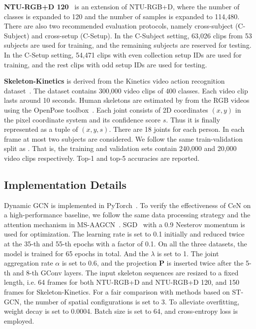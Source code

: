 \documentclass[sigconf]{acmart}
\begin{document}
\noindent\textbf{NTU-RGB+D 120}~\cite{liu2019ntu} is an extension of NTU-RGB+D, where the number of classes is expanded to 120 and the number of samples is expanded to 114,480. There are also two recommended evaluation protocols, namely cross-subject (C-Subject) and cross-setup (C-Setup). In the C-Subject setting, 63,026 clips from 53 subjects are used for training, and the remaining subjects are reserved for testing. In the C-Setup setting, 54,471 clips with even collection setup IDs are used for training, and the rest clips with odd setup IDs are used for testing.

\noindent\textbf{Skeleton-Kinetics} is derived from the Kinetics video action recognition dataset~\cite{kay2017kinetics}. The dataset contains 300,000 video clips of 400 classes. Each video clip lasts around 10 seconds. Human skeletons are estimated by \cite{yanspatial} from the RGB videos using the OpenPose toolbox~\cite{cao2018openpose}. Each joint consists of 2D coordinates $(x, y)$ in the pixel coordinate system and its confidence score $s$. Thus it is finally represented as a tuple of $(x, y, s)$. There are 18 joints for each person. In each frame at most two subjects are considered. We follow the same train-validation split as \cite{yanspatial}. That is, the training and validation sets contain 240,000 and 20,000 video clips respectively. Top-1 and top-5 accuracies are reported.

\subsection{Implementation Details}
Dynamic GCN is implemented in PyTorch~\cite{paszke2017automatic}. To verify the effectiveness of CeN on a high-performance baseline, we follow the same data processing strategy and the attention mechanism in MS-AAGCN~\cite{shi2019}. SGD~\cite{bottou2010large} with a 0.9 Nesterov momentum is used for optimization. The learning rate is set to 0.1 initially and reduced twice at the 35-th and 55-th epochs with a factor of 0.1. On all the three datasets, the model is trained for 65 epochs in total. And the $\lambda$ is set to 1. The joint aggregation rate $\alpha $ is set to 0.6, and the projection $\mathbf{P}$ is inserted twice after the 5-th and 8-th GConv layers. The input skeleton sequences are resized to a fixed length, i.e. 64 frames for both NTU-RGB+D and NTU-RGB+D 120, and 150 frames for Skeleton-Kinetics. For a fair comparison with methods based on ST-GCN, the number of spatial configurations is set to 3. To alleviate overfitting, weight decay is set to 0.0004. Batch size is set to 64, and cross-entropy loss is employed.
\end{document}
